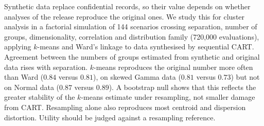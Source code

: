Synthetic data replace confidential records, so their value depends
on whether analyses of the release reproduce the original ones. We study
this for cluster analysis in a factorial simulation of 144 scenarios crossing
separation, number of groups, dimensionality, correlation and distribution
family (720{,}000 evaluations), applying $k$-means and Ward's linkage to data
synthesised by sequential CART. Agreement between the numbers of groups
estimated from synthetic and original data rises with separation. $k$-means
reproduces the original number more often than Ward ($0.84$ versus $0.81$),
on skewed Gamma data ($0.81$ versus $0.73$) but not on Normal data ($0.87$
versus $0.89$). A bootstrap null shows that this reflects the greater
stability of the $k$-means estimate under resampling, not smaller damage from
CART. Resampling alone also reproduces most centroid and dispersion distortion.
Utility should be judged against a resampling reference.%
